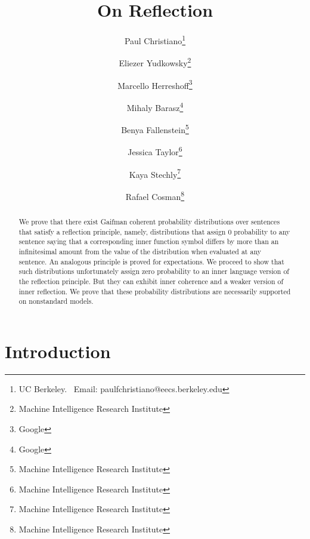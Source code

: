 \documentclass[12pt]{article}
\theoremstyle{plain}
\theoremstyle{definition}
\theoremstyle{remark}
\begin{document}
\title{On Reflection \\ }
\author{
Paul Christiano\thanks{UC Berkeley. \ Email: paulfchristiano@eecs.berkeley.edu}
\and
Eliezer Yudkowsky\thanks{Machine Intelligence Research Institute}
\and
Marcello Herreshoff\thanks{Google}
\and
Mihaly Barasz\thanks{Google}
\and 
Benya Fallenstein\thanks{Machine Intelligence Research Institute}
\and
Jessica Taylor\thanks{Machine Intelligence Research Institute}
\and 
Kaya Stechly\thanks{Machine Intelligence Research Institute}
\and
Rafael Cosman\thanks{Machine Intelligence Research Institute}
}
\maketitle
\begin{abstract}
We prove that there exist Gaifman coherent probability distributions over sentences that satisfy a reflection principle, namely, distributions that assign 0 probability to any sentence saying that a corresponding inner function symbol differs by more than an infinitesimal amount from the value of the distribution when evaluated at any sentence. An analogous principle is proved for expectations. We proceed to show that such distributions unfortunately assign zero probability to an inner language version of the reflection principle. But they can exhibit inner coherence and a weaker version of inner reflection. We prove that these probability distributions are necessarily supported on nonstandard models.
\end{abstract}
\setcounter{section}{-1}
\section{Introduction}





\end{document}
